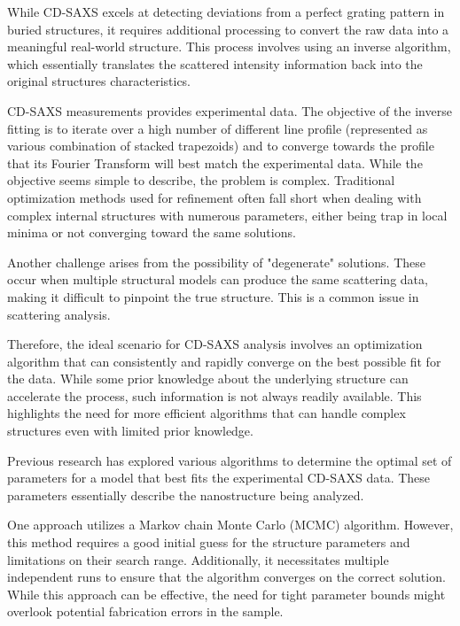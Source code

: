 While CD-SAXS excels at detecting deviations from a perfect grating pattern in buried structures, it requires 
additional processing to convert the raw data into a meaningful real-world structure. This process involves using 
an inverse algorithm, which essentially translates the scattered intensity information back into the original structures 
characteristics.

\medskip

CD-SAXS measurements provides experimental data. The objective of the inverse fitting is to iterate over a high number of different line profile (represented as various combination of stacked trapezoids)
and to converge towards the profile that its Fourier Transform will best match the experimental data. While the objective seems simple to describe, 
the problem is complex. Traditional optimization methods used for refinement often fall short when dealing with 
complex internal structures with numerous parameters, either being trap in local minima or not converging toward the same solutions.

\medskip

Another challenge arises from the possibility of "degenerate" solutions. These occur when multiple structural 
models can produce the same scattering data, making it difficult to pinpoint the true structure. This is a common 
issue in scattering analysis.

\medskip

Therefore, the ideal scenario for CD-SAXS analysis involves an optimization algorithm that can consistently and 
rapidly converge on the best possible fit for the data. While some prior knowledge about the underlying structure 
can accelerate the process, such information is not always readily available. This highlights the need for more 
efficient algorithms that can handle complex structures even with limited prior knowledge.

\medskip

Previous research has explored various algorithms to determine the optimal set of parameters for a model that 
best fits the experimental CD-SAXS data. These parameters essentially describe the nanostructure 
being analyzed.

\medskip

One approach utilizes a Markov chain Monte Carlo (MCMC) algorithm. However, this method requires a good initial 
guess for the structure parameters and limitations on their search range. Additionally, it necessitates multiple 
independent runs to ensure that the algorithm converges on the correct solution. While this approach can be effective, 
the need for tight parameter bounds might overlook potential fabrication errors in the sample.

